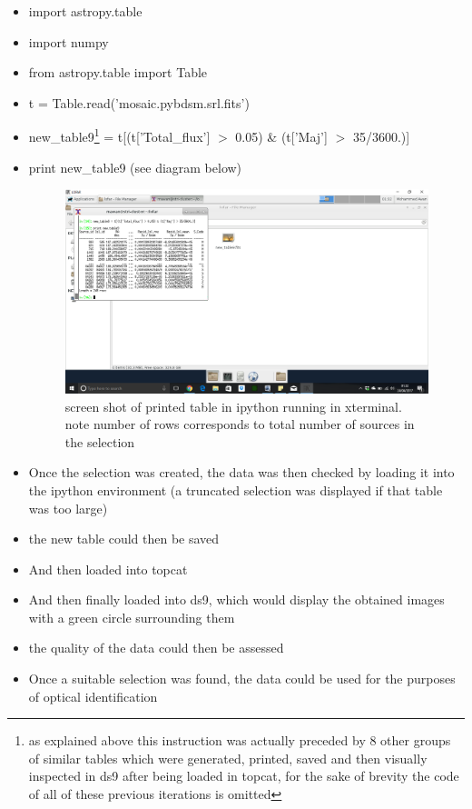 \documentclass{article}
\begin{document}
\begin{itemize}
    \item import astropy.table
    \item import numpy
    \item from astropy.table import Table
    \item t = Table.read('mosaic.pybdsm.srl.fits')
    \item new{\_t}able9\footnote{as explained above this instruction was actually preceded by 8 other groups of similar tables which were generated, printed, saved and then visually inspected in ds9 after being loaded in topcat, for the sake of brevity the code of all of these previous iterations is omitted} = t[(t['Total{\_}flux'] $>$ 0.05) {\&} (t['Maj'] $>$ 35/3600.)]
    \item print new{\_}table9 (see diagram below)
    \begin{figure}
        \centering
        \includegraphics[scale = 0.3]{newtable9.png}
        \caption{screen shot of printed table in ipython running in xterminal. note number of rows corresponds to total number of sources in the selection}
    \end{figure}
    \item Once the selection was created, the data was then checked by loading it into the ipython environment (a truncated selection was displayed if that table was too large)
    \item the new table could then be saved 
    \item And then loaded into topcat
    \item And then finally loaded into ds9, which would display the obtained images with a green circle surrounding them
    \item the quality of the data could then be assessed
    \item Once a suitable selection was found, the data could be used for the purposes of optical identification
\end{itemize}
\end{document}
